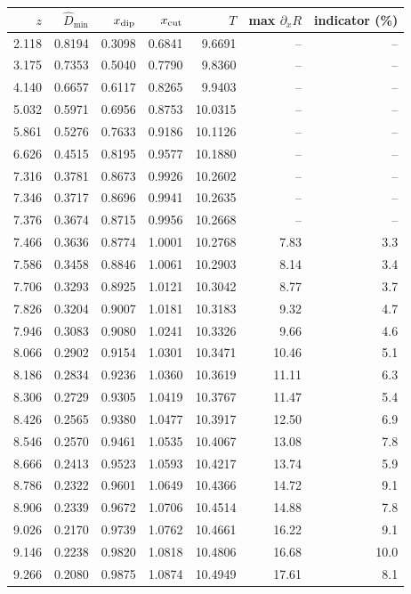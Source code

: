 \begin{tabular}{rrrrrrr}
\toprule
$z$ & $\hat D_{\min}$ & $x_{\rm dip}$ & $x_{\rm cut}$ & $T$ & max $\partial_xR$ & indicator (\%)\\
\midrule
2.118 & 0.8194 & 0.3098 & 0.6841 & 9.6691 & -- & --\\
3.175 & 0.7353 & 0.5040 & 0.7790 & 9.8360 & -- & --\\
4.140 & 0.6657 & 0.6117 & 0.8265 & 9.9403 & -- & --\\
5.032 & 0.5971 & 0.6956 & 0.8753 & 10.0315 & -- & --\\
5.861 & 0.5276 & 0.7633 & 0.9186 & 10.1126 & -- & --\\
6.626 & 0.4515 & 0.8195 & 0.9577 & 10.1880 & -- & --\\
7.316 & 0.3781 & 0.8673 & 0.9926 & 10.2602 & -- & --\\
7.346 & 0.3717 & 0.8696 & 0.9941 & 10.2635 & -- & --\\
7.376 & 0.3674 & 0.8715 & 0.9956 & 10.2668 & -- & --\\
7.466 & 0.3636 & 0.8774 & 1.0001 & 10.2768 & 7.83 & 3.3\\
7.586 & 0.3458 & 0.8846 & 1.0061 & 10.2903 & 8.14 & 3.4\\
7.706 & 0.3293 & 0.8925 & 1.0121 & 10.3042 & 8.77 & 3.7\\
7.826 & 0.3204 & 0.9007 & 1.0181 & 10.3183 & 9.32 & 4.7\\
7.946 & 0.3083 & 0.9080 & 1.0241 & 10.3326 & 9.66 & 4.6\\
8.066 & 0.2902 & 0.9154 & 1.0301 & 10.3471 & 10.46 & 5.1\\
8.186 & 0.2834 & 0.9236 & 1.0360 & 10.3619 & 11.11 & 6.3\\
8.306 & 0.2729 & 0.9305 & 1.0419 & 10.3767 & 11.47 & 5.4\\
8.426 & 0.2565 & 0.9380 & 1.0477 & 10.3917 & 12.50 & 6.9\\
8.546 & 0.2570 & 0.9461 & 1.0535 & 10.4067 & 13.08 & 7.8\\
8.666 & 0.2413 & 0.9523 & 1.0593 & 10.4217 & 13.74 & 5.9\\
8.786 & 0.2322 & 0.9601 & 1.0649 & 10.4366 & 14.72 & 9.1\\
8.906 & 0.2339 & 0.9672 & 1.0706 & 10.4514 & 14.88 & 7.8\\
9.026 & 0.2170 & 0.9739 & 1.0762 & 10.4661 & 16.22 & 9.1\\
9.146 & 0.2238 & 0.9820 & 1.0818 & 10.4806 & 16.68 & 10.0\\
9.266 & 0.2080 & 0.9875 & 1.0874 & 10.4949 & 17.61 & 8.1\\

\end{tabular}
